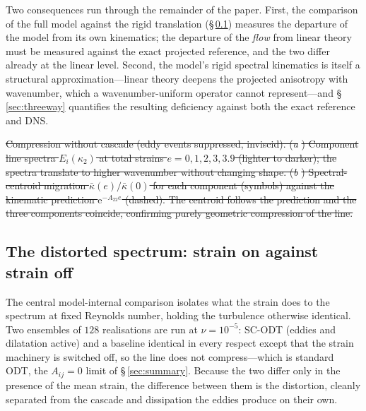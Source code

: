 \documentclass[lineno]{JFM-FLM_Au}
\providecommand{\DIFdel}[1]{{\protect\color{red}\sout{#1}}} %
\providecommand{\DIFdelbegin}{} %
\providecommand{\DIFdelend}{} %
\providecommand{\DIFdelFL}[1]{\DIFdel{#1}} %
\begin{document}
Two consequences run through the remainder of the paper. First, the
comparison of the full model against the rigid translation
(\S\,\ref{sec:spec-bvc}) measures the departure of the model from its own
kinematics; the departure of the \emph{flow} from linear theory must be
measured against the exact projected reference, and the two differ already
at the linear level. Second, the model's rigid spectral kinematics is
itself a structural approximation---linear theory deepens the projected
anisotropy with wavenumber, which a wavenumber-uniform operator cannot
represent---and \S\,\ref{sec:threeway} quantifies the resulting deficiency
against both the exact reference and DNS.

\DIFdelbegin %
{%
\DIFdelFL{Compression without cascade (eddy events suppressed, inviscid).
  (}\textit{\DIFdelFL{a}}%
\DIFdelFL{) Component line spectra $E_i(\kappa_2)$ at total strains
  $e=0,1,2,3,3.9$ (lighter to darker); the spectra translate to higher
  wavenumber without changing shape.
  (}\textit{\DIFdelFL{b}}%
\DIFdelFL{) Spectral-centroid migration $\bar\kappa(e)/\bar\kappa(0)$
  for each component (symbols) against the kinematic prediction
  $\mathrm{e}^{-A_{22}e}$ (dashed). The centroid follows the prediction
  and the three components coincide, confirming purely geometric
  compression of the line.}}

\DIFdelend %

\subsection{The distorted spectrum: strain on against strain
off}\label{sec:spec-bvc}

The central model-internal comparison isolates what the strain does to
the spectrum at fixed Reynolds number, holding the turbulence otherwise
identical. Two ensembles of $128$ realisations are run at $\nu=10^{-5}$:
SC-ODT (eddies and dilatation active) and a baseline identical
in every respect except that the strain machinery is switched off, so
the line does not compress---which is standard ODT, the $A_{ij}=0$
limit of \S\,\ref{sec:summary}. Because the two differ only in the presence
of the mean strain, the difference between them is the distortion,
cleanly separated from the cascade and dissipation the eddies produce on
their own.
\end{document}
